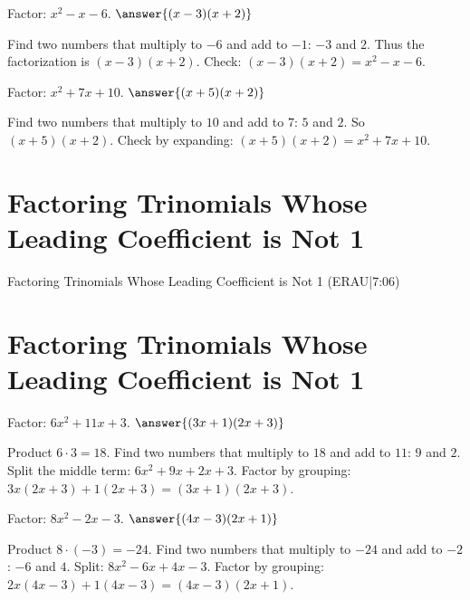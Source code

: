 \documentclass{ximera}
\begin{document}
\begin{problem}
Factor: \(x^2 - x - 6\). $\answer{(x-3)(x+2)}$
\begin{feedback}
Find two numbers that multiply to \(-6\) and add to \(-1\): \(-3\) and \(2\). Thus the factorization is \((x-3)(x+2)\). Check: \((x-3)(x+2)=x^2-x-6\).
\end{feedback}
\end{problem}

\begin{problem}
Factor: \(x^2 + 7x + 10\). $\answer{(x+5)(x+2)}$
\begin{feedback}
Find two numbers that multiply to \(10\) and add to \(7\): \(5\) and \(2\). So \((x+5)(x+2)\). Check by expanding: \((x+5)(x+2)=x^2+7x+10\).
\end{feedback}
\end{problem}


\section*{Factoring Trinomials Whose Leading Coefficient is Not 1}

Factoring Trinomials Whose Leading Coefficient is Not 1 (ERAU|7:06)



\section*{Factoring Trinomials Whose Leading Coefficient is Not 1}

\begin{problem}
Factor: \(6x^2 + 11x + 3\). $\answer{(3x+1)(2x+3)}$
\begin{feedback}
Product \(6\cdot3=18\). Find two numbers that multiply to \(18\) and add to \(11\): \(9\) and \(2\). Split the middle term: \(6x^2+9x+2x+3\). Factor by grouping: \(3x(2x+3)+1(2x+3)=(3x+1)(2x+3)\).
\end{feedback}
\end{problem}

\begin{problem}
Factor: \(8x^2 - 2x - 3\). $\answer{(4x-3)(2x+1)}$
\begin{feedback}
Product \(8\cdot(-3)=-24\). Find two numbers that multiply to \(-24\) and add to \(-2\): \(-6\) and \(4\). Split: \(8x^2-6x+4x-3\). Factor by grouping: \(2x(4x-3)+1(4x-3)=(4x-3)(2x+1)\).
\end{feedback}
\end{problem}
\end{document}
